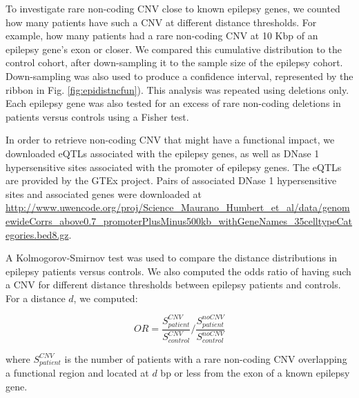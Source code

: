 To investigate rare non-coding CNV close to known epilepsy genes, we counted how many patients have such a CNV at different distance thresholds.
For example, how many patients had a rare non-coding CNV at 10 Kbp of an epilepsy gene's exon or closer.
We compared this cumulative distribution to the control cohort, after down-sampling it to the sample size of the epilepsy cohort.
Down-sampling was also used to produce a confidence interval, represented by the ribbon in Fig. \ref{fig:epidistncfun}).
This analysis was repeated using deletions only.
Each epilepsy gene was also tested for an excess of rare non-coding deletions in patients versus controls using a Fisher test.

In order to retrieve non-coding CNV that might have a functional impact, we downloaded eQTLs associated with the epilepsy genes, as well as DNase 1 hypersensitive sites associated with the promoter of epilepsy genes.
The eQTLs are provided by the GTEx project\citep{Ardlie2015}.
Pairs of associated DNase 1 hypersensitive sites and associated genes\citep{Maurano2012} were downloaded at \url{http://www.uwencode.org/proj/Science_Maurano_Humbert_et_al/data/genomewideCorrs_above0.7_promoterPlusMinus500kb_withGeneNames_35celltypeCategories.bed8.gz}.

A Kolmogorov-Smirnov test was used to compare the distance distributions in epilepsy patients versus controls.
We also computed the odds ratio of having such a CNV for different distance thresholds between epilepsy patients and controls.
For a distance $d$, we computed:

$$ OR = \frac{S_{patient}^{CNV}}{S_{control}^{CNV}} / \frac{S_{patient}^{noCNV}}{S_{control}^{noCNV}} $$

where $S_{patient}^{CNV}$ is the number of patients with a rare non-coding CNV overlapping a functional region and located at $d$ bp or less from the exon of a known epilepsy gene.


